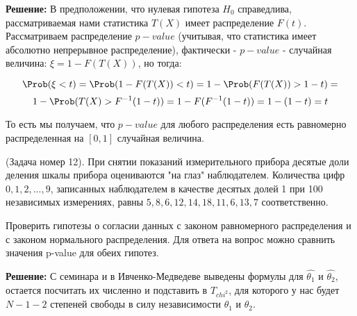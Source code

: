 \documentclass[12pt]{article}
\theoremstyle{definiton}
\theoremstyle{definition}
\theoremstyle{definition}
\newcounter{problem}
\newcounter{subproblem}
\def\prp{\medskip\noindent\stepcounter{problem}{\bf Задача \theproblem .  }\setcounter{subproblem}{0} }
\begin{document}
\textbf{Решение: } В предположении, что нулевая гипотеза $H_0$ справедлива, рассматриваемая нами статистика $T(X)$ имеет распределение $F(t)$. Рассматриваем распределение $p-value$ (учитывая, что статистика имеет абсолютно непрерывное распределение), фактически - $p-value$ - случайная величина: $\xi = 1 - F(T(X))$, но тогда:



$$\Prob(\xi < t) = \Prob(1 - F(T(X)) < t) = 1 - \Prob(F(T(X)) > 1 - t) = $$
$$1 - \Prob(T(X) > F^{-1}(1-t)) = 1 - F(F^{-1}(1-t)) = 1 - (1-t) = t$$

То есть мы получаем, что $p-value$ для любого распределения есть равномерно распределенная на $[0,1]$ случайная величина.

\prp (Задача номер 12). При снятии показаний измерительного прибора
десятые доли деления шкалы прибора оцениваются "на глаз" \newline наблюдателем.
Количества цифр $0, 1, 2, ..., 9$, записанных наблюдателем в качестве десятых долей 1 при 100 независимых измерениях, равны $5, 8, 6, 12, 14, 18, 11, 6, 13, 7$ соответственно.

Проверить гипотезы о согласии данных с законом равномерного распределения и
с законом нормального распределения. Для ответа на вопрос можно сравнить
значения p-value для обеих гипотез.

\textbf{Решение: } С семинара и в Ивченко-Медведеве выведены формулы для $\widehat{\theta_1}$ и $\widehat{\theta_2}$, остается посчитать их численно и подставить в $T_{chi^2}$, для которого у нас будет $N-1-2$ степеней свободы в силу независимости $\theta_1$ и $\theta_2$.
\end{document}
